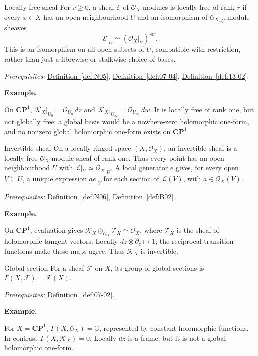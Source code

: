 \documentclass[11pt]{article}
\makeatletter
\newcommand{\C}{\mathbb C}
\newcounter{definition}
\newcommand{\CP}{\mathbf{CP}}
\newcommand{\exampleheading}{\par\medskip\textbf{Example.}\par\smallskip}
\newcommand{\currentdefinition}[1]{\protected@edef\@currentlabel{#1}}
\makeatother
\begin{document}
\begin{definitionbox}{Locally free sheaf}
\currentdefinition{\thedefinition}
\label{def:N06}
For $r\ge0$, a sheaf $\mathcal E$ of $\mathcal O_X$-modules is locally free of rank $r$ if every $x\in X$ has an open neighbourhood $U$ and an isomorphism of $\mathcal O_X|_U$-module sheaves
\[\mathcal E|_U\simeq(\mathcal O_X|_U)^{\oplus r}.\]
This is an isomorphism on all open subsets of $U$, compatible with restriction, rather than just a fibrewise or stalkwise choice of bases.

\smallskip
\textit{Prerequisites:} \hyperref[def:N05]{Definition~\ref*{def:N05}}, \hyperref[def:07-04]{Definition~\ref*{def:07-04}}, \hyperref[def:13-02]{Definition~\ref*{def:13-02}}.

\exampleheading
On $\CP^1$, $\mathcal K_X|_{U_0}=\mathcal O_{U_0}\,dz$ and $\mathcal K_X|_{U_\infty}=\mathcal O_{U_\infty}\,dw$. It is locally free of rank one, but not globally free: a global basis would be a nowhere-zero holomorphic one-form, and no nonzero global holomorphic one-form exists on $\CP^1$.
\end{definitionbox}

\begin{definitionbox}{Invertible sheaf}
\currentdefinition{\thedefinition}
\label{def:N07}
On a locally ringed space $(X,\mathcal O_X)$, an invertible sheaf is a locally free $\mathcal O_X$-module sheaf of rank one. Thus every point has an open neighbourhood $U$ with $\mathcal L|_U\simeq\mathcal O_X|_U$. A local generator $e$ gives, for every open $V\subseteq U$, a unique expression $ae|_V$ for each section of $\mathcal L(V)$, with $a\in\mathcal O_X(V)$.

\smallskip
\textit{Prerequisites:} \hyperref[def:N06]{Definition~\ref*{def:N06}}, \hyperref[def:B02]{Definition~\ref*{def:B02}}.

\exampleheading
On $\CP^1$, evaluation gives $\mathcal K_X\otimes_{\mathcal O_X}\mathcal T_X\simeq\mathcal O_X$, where $\mathcal T_X$ is the sheaf of holomorphic tangent vectors. Locally $dz\otimes\partial_z\mapsto1$; the reciprocal transition functions make these maps agree. Thus $\mathcal K_X$ is invertible.
\end{definitionbox}

\begin{definitionbox}{Global section}
\currentdefinition{\thedefinition}
\label{def:07-03}
For a sheaf $\mathcal F$ on $X$, its group of global sections is $\Gamma(X,\mathcal F)=\mathcal F(X)$.

\smallskip
\textit{Prerequisites:} \hyperref[def:07-02]{Definition~\ref*{def:07-02}}.

\exampleheading
For $X=\CP^1$, $\Gamma(X,\mathcal O_X)=\C$, represented by constant holomorphic functions. In contrast $\Gamma(X,\mathcal K_X)=0$. Locally $dz$ is a frame, but it is not a global holomorphic one-form.
\end{definitionbox}
\end{document}
